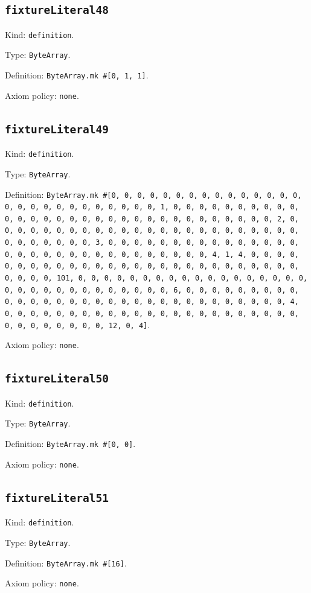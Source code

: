 \documentclass[11pt]{article}
\begin{document}
\subsection*{\texttt{fixtureLiteral48}}
\noindent Kind: \texttt{definition}.\par
\noindent Type: \texttt{ByteArray}.\par
\noindent Definition: \texttt{ByteArray.mk \#[0, 1, 1]}.\par
\noindent Axiom policy: \texttt{none}.\par
\subsection*{\texttt{fixtureLiteral49}}
\noindent Kind: \texttt{definition}.\par
\noindent Type: \texttt{ByteArray}.\par
\noindent Definition: \texttt{ByteArray.mk \#[0, 0, 0, 0, 0, 0, 0, 0, 0, 0, 0, 0, 0, 0, 0, 0, 0, 0, 0, 0, 0, 0, 0, 0, 0, 0, 0, 1, 0, 0, 0, 0, 0, 0, 0, 0, 0, 0, 0, 0, 0, 0, 0, 0, 0, 0, 0, 0, 0, 0, 0, 0, 0, 0, 0, 0, 0, 0, 0, 2, 0, 0, 0, 0, 0, 0, 0, 0, 0, 0, 0, 0, 0, 0, 0, 0, 0, 0, 0, 0, 0, 0, 0, 0, 0, 0, 0, 0, 0, 0, 0, 3, 0, 0, 0, 0, 0, 0, 0, 0, 0, 0, 0, 0, 0, 0, 0, 0, 0, 0, 0, 0, 0, 0, 0, 0, 0, 0, 0, 0, 0, 0, 0, 4, 1, 4, 0, 0, 0, 0, 0, 0, 0, 0, 0, 0, 0, 0, 0, 0, 0, 0, 0, 0, 0, 0, 0, 0, 0, 0, 0, 0, 0, 0, 0, 0, 0, 101, 0, 0, 0, 0, 0, 0, 0, 0, 0, 0, 0, 0, 0, 0, 0, 0, 0, 0, 0, 0, 0, 0, 0, 0, 0, 0, 0, 0, 0, 0, 0, 6, 0, 0, 0, 0, 0, 0, 0, 0, 0, 0, 0, 0, 0, 0, 0, 0, 0, 0, 0, 0, 0, 0, 0, 0, 0, 0, 0, 0, 0, 0, 0, 4, 0, 0, 0, 0, 0, 0, 0, 0, 0, 0, 0, 0, 0, 0, 0, 0, 0, 0, 0, 0, 0, 0, 0, 0, 0, 0, 0, 0, 0, 0, 0, 12, 0, 4]}.\par
\noindent Axiom policy: \texttt{none}.\par
\subsection*{\texttt{fixtureLiteral50}}
\noindent Kind: \texttt{definition}.\par
\noindent Type: \texttt{ByteArray}.\par
\noindent Definition: \texttt{ByteArray.mk \#[0, 0]}.\par
\noindent Axiom policy: \texttt{none}.\par
\subsection*{\texttt{fixtureLiteral51}}
\noindent Kind: \texttt{definition}.\par
\noindent Type: \texttt{ByteArray}.\par
\noindent Definition: \texttt{ByteArray.mk \#[16]}.\par
\noindent Axiom policy: \texttt{none}.\par
\end{document}
